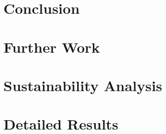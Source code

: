 \documentclass[a4paper, 12pt, openany]{book} %
\begin{document}
\chapter{Conclusion}

\cleardoublepage

\chapter{Further Work}

\cleardoublepage

\chapter{Sustainability Analysis}

\cleardoublepage


\cleardoublepage

\appendix
\chapter{Detailed Results}
\fancyhf{} %
\renewcommand{\headrulewidth}{0pt} %
\fancyfoot[C]{\thepage} %



\end{document}
